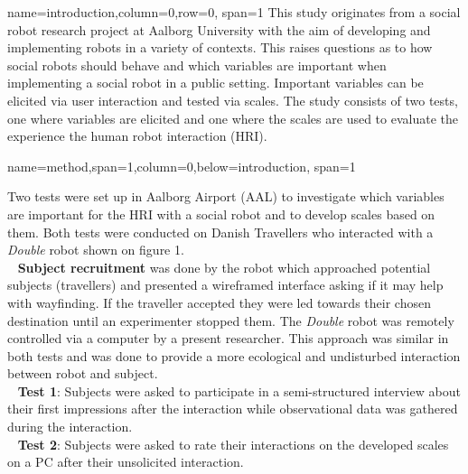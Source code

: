 \documentclass[paperwidth=118cm,paperheight=84cm,landscape,fontscale=0.2941]{baposter}
\begin{document}
\begin{poster}
{name=introduction,column=0,row=0, span=1}
{\parskip 5pt   
This study originates from a social robot research project at Aalborg University with the aim of developing and implementing robots in a variety of contexts. This raises questions as to how social robots should behave and which variables are important when implementing a social robot in a public setting. Important variables can be elicited via user interaction and tested via scales. The study consists of two tests, one where variables are elicited and one where the scales are used to evaluate the experience the human robot interaction (HRI). %
}

{name=method,span=1,column=0,below=introduction, span=1}
{\parskip 5pt 
Two tests were set up in Aalborg Airport (AAL) to investigate which variables are important for the HRI with a social robot and to develop scales based on them. Both tests were conducted on Danish Travellers who interacted with a \textit{Double} robot shown on figure 1.\\
\textbullet~ \textbf{Subject recruitment} was done by the robot which approached potential subjects (travellers) and presented a wireframed interface asking if it may help with wayfinding. If the traveller accepted  they were led towards their chosen destination until an experimenter stopped them. The \textit{Double} robot was remotely controlled via a computer by a present researcher. This approach was similar in both tests and was done to provide a more ecological and undisturbed interaction between robot and subject.\\
\textbullet~ \textbf{Test 1}: Subjects were asked to participate in a semi-structured interview about their first impressions after the interaction while observational data was gathered during the interaction. \\
\textbullet~ \textbf{Test 2}: Subjects were asked to rate their interactions on the developed scales on a PC after their unsolicited interaction.
\vspace{-11pt}  

}
\end{poster}
\end{document}
